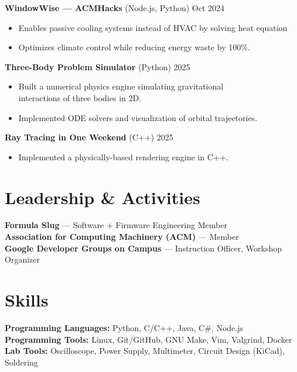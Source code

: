 \documentclass[a4paper,10pt]{article}
\begin{document}
\textbf{WindowWise --- ACMHacks} (Node.js, Python) \hfill Oct 2024
\begin{itemize}
    \item Enables passive cooling systems instead of HVAC by solving heat equation
    \item Optimizes climate control while reducing energy waste by 100\%.
\end{itemize}

\textbf{Three-Body Problem Simulator} (Python) \hfill 2025
\begin{itemize}
    \item Built a numerical physics engine simulating gravitational \\
        interactions of three bodies in 2D.
    \item Implemented ODE solvers and visualization of orbital trajectories.
\end{itemize}

\textbf{Ray Tracing in One Weekend} (C++) \hfill 2025
\begin{itemize}
    \item Implemented a physically-based rendering engine in C++.
\end{itemize}

\section*{Leadership \& Activities}
\textbf{Formula Slug} --- Software + Firmware Engineering Member \\
\textbf{Association for Computing Machinery (ACM)} --- Member \\
\textbf{Google Developer Groups on Campus} --- Instruction Officer, Workshop
Organizer

\section*{Skills}
\textbf{Programming Languages:} Python, C/C++, Java, C\#, Node.js \\
\textbf{Programming Tools:} Linux, Git/GitHub, GNU Make, Vim, Valgrind, Docker \\
\textbf{Lab Tools:} Oscilloscope, Power Supply, Multimeter, Circuit Design (KiCad), Soldering
\end{document}
